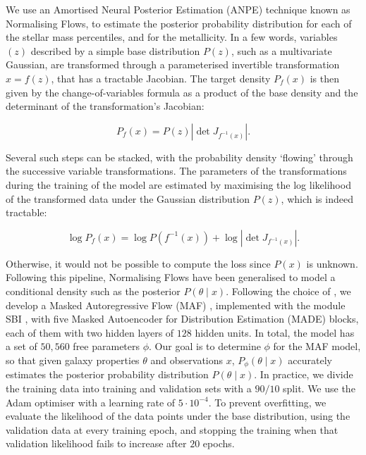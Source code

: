 We use an Amortised Neural Posterior Estimation (ANPE) technique known as Normalising Flows, to estimate the posterior probability distribution for each of the stellar mass percentiles, and for the metallicity. In a few words, variables $(z)$ described by a simple base distribution $P(z)$, such as a multivariate Gaussian, are transformed through a parameterised invertible transformation $x=f(z)$, that has a tractable Jacobian. The target density $P_f(x)$ is then given by the change-of-variables formula as a product of the base density and the determinant of the transformation's Jacobian:

\begin{equation}
P_f(x)=P(z)\left|\operatorname{det} J_{f^{-1}(x)}\right|.
\end{equation}

Several such steps can be stacked, with the probability density `flowing' through the successive variable transformations. The parameters of the transformations during the training of the model are estimated by maximising the log likelihood of the transformed data under the Gaussian distribution $P(z)$, which is indeed tractable:

\begin{equation}
\log P_f(x)=\log P(f^{-1}(x))+\log \left|\operatorname{det} J_{f^{-1}(x)}\right|.
\end{equation}

Otherwise, it would not be possible to compute the loss since $P(x)$ is unknown. Following this pipeline, Normalising Flows have been generalised to model a conditional density such as  the posterior $P(\theta \mid x)$. Following the choice of \cite{Hahn_2022}, we develop a Masked Autoregressive Flow (MAF) \citep{papamakarios2018masked}, implemented with the module SBI \citep{tejerocantero2020sbi},  with five Masked Autoencoder for Distribution Estimation (MADE) blocks, each of them with two hidden layers of $128$ hidden units. In total, the model has a set of $50{,}560$ free parameters $\phi$. Our goal is to determine $\phi$ for the MAF model, so that given galaxy properties $\theta$ and observations $x$, $P_{\phi}\left(\theta \mid x \right)$ accurately estimates the posterior probability distribution $P\left(\theta \mid x \right)$.  In practice, we divide the training data into training and validation sets with a $90/10$ split. We use the Adam optimiser with a learning rate of $5\cdot 10^{-4}$. To prevent overfitting, we evaluate the likelihood of the data points under the base distribution, using the validation data at every training epoch, and stopping the training when that validation likelihood fails to increase after $20$ epochs.\\

